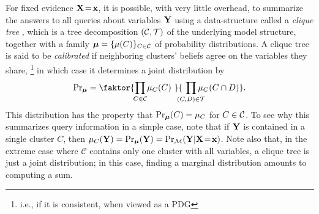 \documentclass[twoside]{article}
\begin{document}
For fixed evidence $\mathbf{X} \!=\! \mathbf{x}$, it is possible, with very
little overhead, to summarize the answers to all queries about variables
$\mathbf{Y}$ using a data-structure called a \emph{clique tree} 
\parencite[\S10]{koller2009probabilistic}, which is a tree decomposition $(\cal C, T)$
of the underlying model structure, together with a family $\boldsymbol\mu =
\{\mu(C)\}_{ C \in \mathcal C}$ of probability distributions.
A clique tree is said to be \emph{calibrated} if neighboring
clusters' beliefs agree on the variables they share,%
    \footnote{i.e., if it is consistent, when viewed as a PDG}
in which case it determines a joint distribution by
\begin{equation}
    {\Pr}_{\bmu} = \faktor
        {\prod_{\mathclap{C \in \cal C}} \mu_C(C)~}
                {~\prod_{\mathclap{(C,D) \in \cal T}} \mu_{C}(C \cap D)}.
    \label{eq:cliquedist}
\end{equation}
This distribution has the property that $\Pr_{\boldsymbol\mu}(C) = \mu_C$ for $C
\in \cal C$.  
To see why this summarizes query information in a simple case, note that if $\mathbf{Y}$ is contained in a single cluster $C$, then $\mu_C(\mathbf{Y}) = \Pr_{\boldsymbol\mu}(\mathbf{Y}) = \Pr_{\cal M}(\mathbf{Y} | \mathbf{X} \!=\! \mathbf{x})$.
Note also that, in the extreme case where $\mathcal C$ contains only
one cluster with all variables, a clique tree is just a joint
distribution; in this case, finding a marginal distribution
amounts to computing a sum.  
\end{document}

